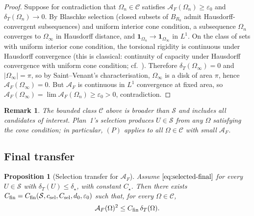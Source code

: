 \documentclass[11pt]{amsart}
\newtheorem{proposition}[theorem]{Proposition}
\newtheorem{remark}[theorem]{Remark}
\newcommand{\dT}{\delta_T}
\newcommand{\AF}{\mathcal A_F}
\newcommand{\eps}{\varepsilon}
\newcommand{\Sclass}{\mathcal S}
\begin{document}
\begin{proof}
Suppose for contradiction that \(\Omega_n\in\mathcal C\) satisfies
\(\AF(\Omega_n)\ge\eps_0\) and \(\dT(\Omega_n)\to 0\).  By Blaschke
selection (closed subsets of \(B_{R_0}\) admit Hausdorff-convergent
subsequences) and uniform interior cone condition, a subsequence
\(\Omega_n\) converges to \(\Omega_\infty\) in Hausdorff distance, and
\(\mathbf 1_{\Omega_n}\to\mathbf 1_{\Omega_\infty}\) in \(L^1\).
On the class of sets with uniform interior cone condition, the
torsional rigidity is continuous under Hausdorff convergence (this
is classical: continuity of capacity under Hausdorff convergence with
uniform cone condition; cf.\ \cite{HP}).  Therefore
\(\dT(\Omega_\infty)=0\) and \(|\Omega_\infty|=\pi\), so by
Saint--Venant's characterisation, \(\Omega_\infty\) is a disk of area
\(\pi\), hence \(\AF(\Omega_\infty)=0\).  But \(\AF\) is continuous in
\(L^1\) convergence at fixed area, so \(\AF(\Omega_\infty)
=\lim\AF(\Omega_n)\ge\eps_0>0\), contradiction.
\end{proof}

\begin{remark}\label{rem:cone}
The bounded class \(\mathcal C\) above is broader than \(\Sclass\) and
includes all candidates of interest.  Plan~1's selection produces
\(U\in\Sclass\) from any \(\Omega\) satisfying the cone condition; in
particular, \((P)\) applies to all \(\Omega\in\mathcal C\) with small
\(\AF\).
\end{remark}

\subsection{Final transfer}

\begin{proposition}[Selection transfer for \(\AF\)]
\label{prop:selection-transfer}
Assume \(\eqref{eq:selected-final}\) for every \(U\in\Sclass\) with
\(\dT(U)\le\delta_\star\), with constant \(C_\star\).  Then there
exists \(C_{\rm fin}=C_{\rm fin}(\Sclass,c_{\rm sel},C_{\rm sel},
d_0,\eps_0)\) such that, for every \(\Omega\in\mathcal C\),
\begin{equation}\label{eq:final-transfer-target}
   \AF(\Omega)^2\le C_{\rm fin}\,\dT(\Omega).
\end{equation}
\end{proposition}
\end{document}

